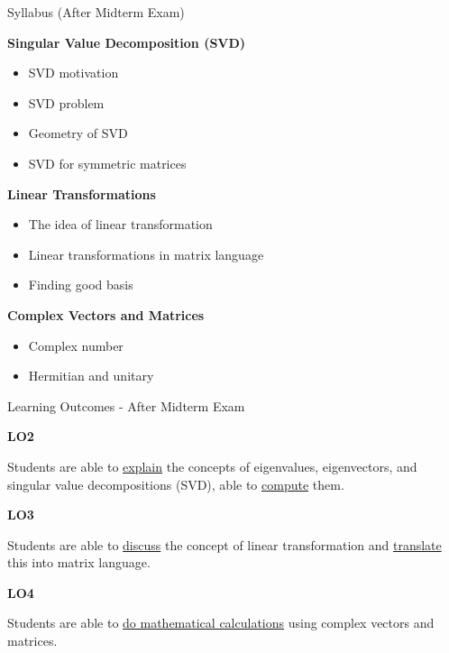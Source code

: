 \begin{frame}[t]{Syllabus (After Midterm Exam)}

    \textbf{Singular Value Decomposition (SVD)}

    \begin{itemize}
        \item SVD motivation
        \item SVD problem
        \item Geometry of SVD
        \item SVD for symmetric matrices
    \end{itemize}

    \textbf{Linear Transformations}

    \begin{itemize}
        \item The idea of linear transformation
        \item Linear transformations in matrix language
        \item Finding good basis
    \end{itemize}

    \textbf{Complex Vectors and Matrices}

    \begin{itemize}
        \item Complex number
        \item Hermitian and unitary
    \end{itemize}

\end{frame}

\begin{frame}[t]{Learning Outcomes - After Midterm Exam}
   
        \textbf{LO2} 

        Students are able to \underline{explain} the concepts of eigenvalues, eigenvectors,
        and singular value decompositions (SVD), able to \underline{compute} them.

        \vspace{0.5cm}
        \textbf{LO3} 

        Students are able to \underline{discuss} the concept of linear transformation and
        \underline{translate} this into matrix language. 
		
		\vspace{0.5cm}
        \textbf{LO4} 
		
		Students are able to \underline{do mathematical calculations} using
        complex vectors and matrices.  

\end{frame}

